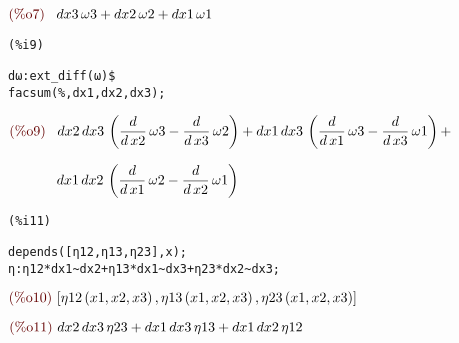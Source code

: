\noindent
\begin{math}\displaystyle
\parbox{8ex}{\color{labelcolor}(\%o7) }
dx3\,\omega3+dx2\,\omega2+dx1\,\omega1
\end{math}


\noindent
\begin{minipage}[t]{8ex}
\color{red}\bf
\begin{verbatim}
(%i9) 
\end{verbatim}
\end{minipage}
\begin{minipage}[t]{\textwidth}
\color{blue}
\begin{verbatim}
dω:ext_diff(ω)$
facsum(%,dx1,dx2,dx3);
\end{verbatim}
\end{minipage}
\begin{math}\displaystyle
\parbox{8ex}{\color{labelcolor}(\%o9) }
dx2\,dx3\,\left( \frac{d}{d\,x2}\,\omega3-\frac{d}{d\,x3}\,\omega2\right) +dx1\,dx3\,\left( \frac{d}{d\,x1}\,\omega3-\frac{d}{d\,x3}\,\omega1\right) +
\end{math}

\noindent
\begin{math}\displaystyle
\phantom{\parbox{8ex}{\color{labelcolor}(\%o9) }}
dx1\,dx2\,\left( \frac{d}{d\,x1}\,\omega2-\frac{d}{d\,x2}\,\omega1\right) 
\end{math}


\noindent
\begin{minipage}[t]{8ex}
\color{red}\bf
\begin{verbatim}
(%i11) 
\end{verbatim}
\end{minipage}
\begin{minipage}[t]{\textwidth}
\color{blue}
\begin{verbatim}
depends([η12,η13,η23],x);
η:η12*dx1~dx2+η13*dx1~dx3+η23*dx2~dx3;
\end{verbatim}
\end{minipage}
\begin{math}\displaystyle
\parbox{8ex}{\color{labelcolor}(\%o10) }
[\mathrm{\eta12}\left( x1,x2,x3\right) ,\mathrm{\eta13}\left( x1,x2,x3\right) ,\mathrm{\eta23}\left( x1,x2,x3\right) ]
\end{math}

\noindent
\begin{math}\displaystyle
\parbox{8ex}{\color{labelcolor}(\%o11) }
dx2\,dx3\,\eta23+dx1\,dx3\,\eta13+dx1\,dx2\,\eta12
\end{math}


